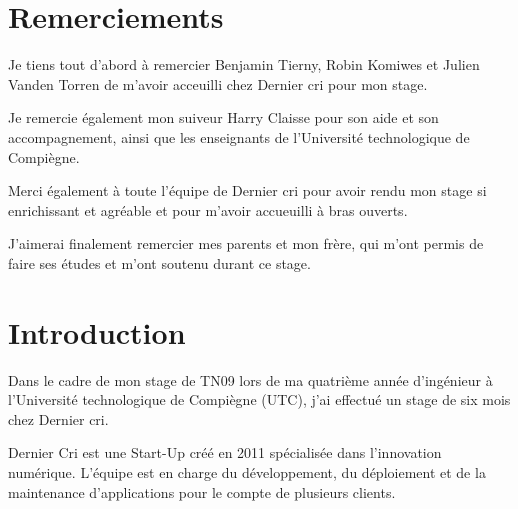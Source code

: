 \newpage

\section{Remerciements}\label{remerciements}

\bigskip

Je tiens tout d'abord à remercier Benjamin Tierny, Robin Komiwes et
Julien Vanden Torren de m'avoir acceuilli chez Dernier cri pour mon
stage.

\bigskip

Je remercie également mon suiveur Harry Claisse pour son aide et son
accompagnement, ainsi que les enseignants de l'Université technologique
de Compiègne.

\bigskip

Merci également à toute l'équipe de Dernier cri pour avoir rendu mon
stage si enrichissant et agréable et pour m'avoir accueuilli à bras
ouverts.

\bigskip

J'aimerai finalement remercier mes parents et mon frère, qui m'ont
permis de faire ses études et m'ont soutenu durant ce stage.

\newpage

\iffalse
\# Résumé et abstract

\bigskip

\subsection{Résumé}\label{ruxe9sumuxe9}

\newpage

\subsection{Abstract}\label{abstract}

\newpage

\fi

\section{Introduction}\label{introduction}

\bigskip

Dans le cadre de mon stage de TN09 lors de ma quatrième année
d'ingénieur à l'Université technologique de Compiègne (UTC), j'ai
effectué un stage de six mois chez Dernier cri.

\bigskip

Dernier Cri est une Start-Up créé en 2011 spécialisée dans l'innovation
numérique. L'équipe est en charge du développement, du déploiement et de
la maintenance d'applications pour le compte de plusieurs clients.

